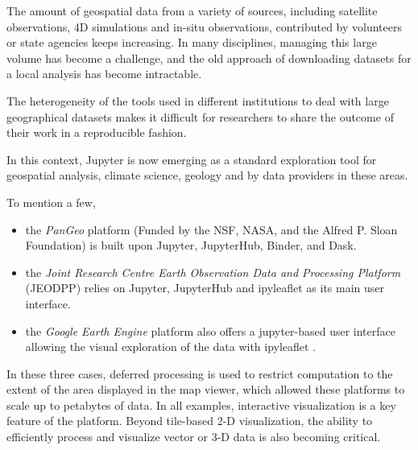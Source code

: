 \begin{task}[
  title=Geosciences application,
  id=geoscience,
  lead=UIO,
  PM=25,
  wphases={0-48},
  partners={QS,SRL,UPSUD,EGI}
]



The amount of geospatial data from a variety of sources, including satellite observations, 4D simulations and in-situ observations, contributed by volunteers
or state agencies keeps increasing. In many disciplines, managing this large volume
has become a challenge, and the old approach of downloading datasets for a local
analysis has become intractable.

The heterogeneity of the tools used in different institutions to deal with
large geographical datasets makes it difficult for researchers to share the outcome
of their work in a reproducible fashion.

In this context, Jupyter is now emerging as a standard exploration tool for
geospatial analysis, climate science, geology and by data providers in these areas.

To mention a few,

\begin{itemize}
\item
   the \emph{PanGeo} platform \cite{Pangeo2018} (Funded by the NSF, NASA, and the
   Alfred P. Sloan Foundation) is built upon Jupyter, JupyterHub, Binder, and Dask.
\item
   the \emph{Joint Research Centre Earth Observation Data and Processing Platform}
   (JEODPP) \cite{Soille2018} relies on Jupyter, JupyterHub and ipyleaflet as
   its main user interface.
\item
   the \emph{Google Earth Engine} platform also offers a jupyter-based user
   interface allowing the visual exploration of the data with ipyleaflet
   \cite{GEEJupyterLeaflet2017}.
\end{itemize}

In these three cases, deferred processing is used to restrict computation to
the extent of the area displayed in the map viewer, which allowed these
platforms to scale up to petabytes of data. In all examples, interactive
visualization is a key feature of the platform. Beyond tile-based
2-D visualization, the ability to efficiently process and visualize vector
or 3-D  data is also becoming critical.


\end{task}
